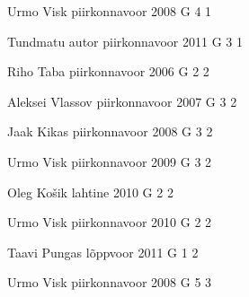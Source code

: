 \documentclass[11pt]{article}
\begin{document}
{Urmo Visk} %
{piirkonnavoor} %
{2008} %
{G 4} %
{1} %
{

\ifEngHint
\fi
}

{Tundmatu autor} %
{piirkonnavoor} %
{2011} %
{G 3} %
{1} %
{

\ifEngHint
\fi
}

{Riho Taba} %
{piirkonnavoor} %
{2006} %
{G 2} %
{2} %
{

\ifEngHint
\fi
}

{Aleksei Vlassov} %
{piirkonnavoor} %
{2007} %
{G 3} %
{2} %
{

\ifEngHint
\fi
}

{Jaak Kikas} %
{piirkonnavoor} %
{2008} %
{G 3} %
{2} %
{

\ifEngHint
\fi
}

{Urmo Visk} %
{piirkonnavoor} %
{2009} %
{G 3} %
{2} %
{

\ifEngHint
\fi
}

{Oleg Košik} %
{lahtine} %
{2010} %
{G 2} %
{2} %
{

\ifEngHint
\fi
}

{Urmo Visk} %
{piirkonnavoor} %
{2010} %
{G 2} %
{2} %
{

\ifEngHint
\fi
}

{Taavi Pungas} %
{lõppvoor} %
{2011} %
{G 1} %
{2} %
{

\ifEngHint
\fi
}

{Urmo Visk} %
{piirkonnavoor} %
{2008} %
{G 5} %
{3} %
{

\ifEngHint
\fi
}
\end{document}
